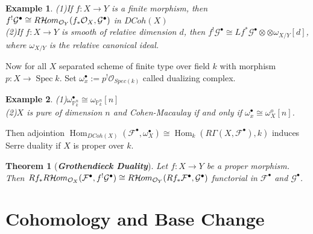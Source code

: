 \documentclass{ctexart}
\newtheorem{theorem}{Theorem}[section]
\newtheorem{example}{Example}[section]
\renewcommand{\hom}{\operatorname{Hom}}
\newcommand{\sheafhom}{\mathcal{H}\kern -.5pt om}
\newcommand{\spec}{\operatorname{Spec}}
\begin{document}
\begin{example}
    (1)If $f: X \longrightarrow Y$ is a finite morphism, 
    then $f^{!}\mathcal{G}^{\bullet} \cong R\sheafhom_{\mathcal{O}_{Y}}(f_{\ast}\mathcal{O}_{X}, \mathcal{G}^{\bullet})$ in $DCoh(X)$ \\
    (2)If $f: X \longrightarrow Y$ is smooth of relative dimension $d$, 
    then $f^{!}\mathcal{G}^{\bullet} \cong Lf^{\ast}\mathcal{G}^{\bullet} \otimes \otimes \omega_{X/Y}[d]$, 
    where $\omega_{X/Y}$ is the relative canonical ideal.
\end{example}
Now for all $X$ separated scheme of finite type over field $k$ with morphism $p: X \longrightarrow \spec k$.
Set $\omega_{x}^{\bullet} := p^{!}\mathcal{O}_{Spec(k)}$ called dualizing complex.
\begin{example}
    (1)$\omega_{\mathbb{P}_{k}^{n}}^{\bullet} \cong \omega_{\mathbb{P}_{k}^{n}}[n]$ \\
    (2)$X$ is pure of dimension $n$ and Cohen-Macaulay if and only if $\omega_{x}^{\bullet} \cong \omega_{X}^{o}[n]$.
\end{example}
Then adjointion $\hom_{DCoh(X)}(\mathcal{F}^{\bullet}, \omega_{X}^{\bullet}) \cong \hom_{k}(R\Gamma(X, \mathcal{F}^{\bullet}), k)$ induces Serre duality if $X$ is proper over $k$.
\begin{theorem}[\textbf{\emph{Grothendieck Duality}}]
    Let $f: X \longrightarrow Y$ be a proper morphism.
    Then $Rf_{\ast}R\sheafhom_{\mathcal{O}_{X}}(\mathcal{F}^{\bullet}, f^{!}\mathcal{G}^{\bullet}) \cong R\sheafhom_{\mathcal{O}_{Y}}(Rf_{\ast}\mathcal{F}^{\bullet}, \mathcal{G}^{\bullet})$ functorial in $\mathcal{F}^{\bullet}$ and $\mathcal{G}^{\bullet}$.
    \label{Theorem 11.5}
\end{theorem}

\section{Cohomology and Base Change}
\label{section:Cohomology_and_Base_Change}
\end{document}
